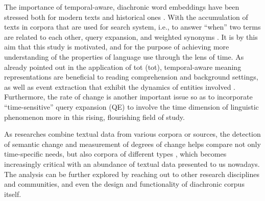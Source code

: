 The importance of temporal-aware, diachronic word embeddings have been stressed both for modern texts and historical ones \parencite{huang2019neural,rosin2017learning,ruder2017word}. With the accumulation of texts in corpora that are used for search system, i.e., to answer ``when'' two terms are related to each other, query expansion, and weighted synonyms \parencite{rosin2017learning}. It is by this aim that this study is motivated, and for the purpose of achieving more understanding of the properties of language use through the lens of time. As already pointed out in the application of \acrlong{tot} (\acrshort{tot}), temporal-aware meaning representations are beneficial to reading comprehension and background settings, as well as event extraction that exhibit the dynamics of entities involved \parencite{wijaya2011understanding}. Furthermore, the rate of change is another important issue so as to incorporate ``time-sensitive'' query expansion (QE) \parencite{rosin2017learning} to involve the time dimension of linguistic phenomenon more in this rising, flourishing field of study.

As researches combine textual data from various corpora or sources, the detection of semantic change and measurement of degrees of change helps compare not only time-specific needs, but also corpora of different types \parencite{schlechtweg2019wind}, which becomes increasingly critical with an abundance of textual data presented to us nowadays. The analysis can be further explored by reaching out to other research disciplines and communities, and even the design and functionality of diachronic corpus itself.
